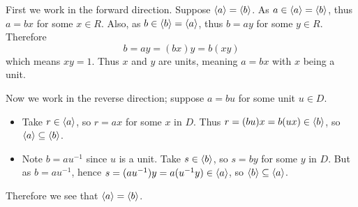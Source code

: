 \begin{questions}
    \item First we work in the forward direction. Suppose $\left\langle a\right\rangle = \left\langle b\right\rangle$. As $a \in \left\langle a\right\rangle = \left\langle b\right\rangle$, thus $a = bx$ for some $x \in R$. Also, as $b \in \left\langle b\right\rangle = \left\langle a\right\rangle$, thus $b = ay$ for some $y \in R$. Therefore
    \[
        b = ay = (bx)y = b(xy)
    \]
    which means $xy = 1$. Thus $x$ and $y$ are units, meaning $a = bx$ with $x$ being a unit.

    Now we work in the reverse direction; suppose $a = bu$ for some unit $u \in D$.
    \begin{itemize}
        \item Take $r \in \left\langle a\right\rangle$, so $r = ax$ for some $x$ in $D$. Thus $r = (bu)x = b(ux) \in \left\langle b\right\rangle$, so $\left\langle a\right\rangle \subseteq \left\langle b\right\rangle$.
        \item Note $b = au^{-1}$ since $u$ is a unit. Take $s \in \left\langle b\right\rangle$, so $s = by$ for some $y$ in $D$. But as $b = au^{-1}$, hence $s = (au^{-1})y = a(u^{-1}y) \in \left\langle a\right\rangle$, so $\left\langle b\right\rangle \subseteq \left\langle a\right\rangle$.
    \end{itemize}
    Therefore we see that $\left\langle a\right\rangle = \left\langle b\right\rangle$.
\end{questions}
